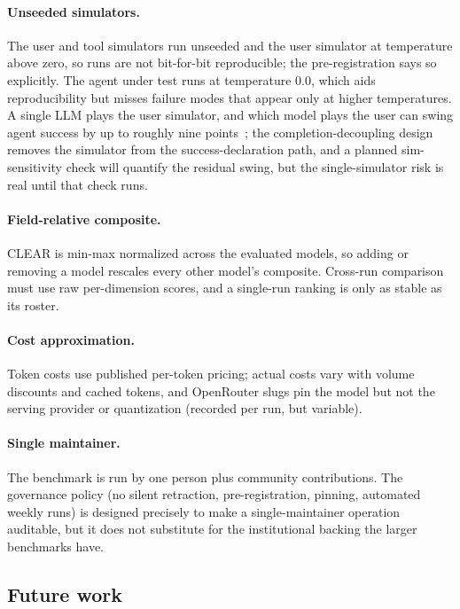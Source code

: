 \paragraph{Unseeded simulators.} The user and tool simulators run unseeded and the
user simulator at temperature above zero, so runs are not bit-for-bit reproducible;
the pre-registration says so explicitly. The agent under test runs at temperature
0.0, which aids reproducibility but misses failure modes that appear only at higher
temperatures. A single LLM plays the user simulator, and which model plays the user
can swing agent success by up to roughly nine points~\cite{lostinsim2026}; the
completion-decoupling design removes the simulator from the success-declaration
path, and a planned sim-sensitivity check will quantify the residual swing, but the
single-simulator risk is real until that check runs.

\paragraph{Field-relative composite.} CLEAR is min-max normalized across the
evaluated models, so adding or removing a model rescales every other model's
composite. Cross-run comparison must use raw per-dimension scores, and a single-run
ranking is only as stable as its roster.

\paragraph{Cost approximation.} Token costs use published per-token pricing; actual
costs vary with volume discounts and cached tokens, and OpenRouter slugs pin the
model but not the serving provider or quantization (recorded per run, but variable).

\paragraph{Single maintainer.} The benchmark is run by one person plus community
contributions. The governance policy (no silent retraction, pre-registration,
pinning, automated weekly runs) is designed precisely to make a single-maintainer
operation auditable, but it does not substitute for the institutional backing the
larger benchmarks have.

\subsection*{Future work}


